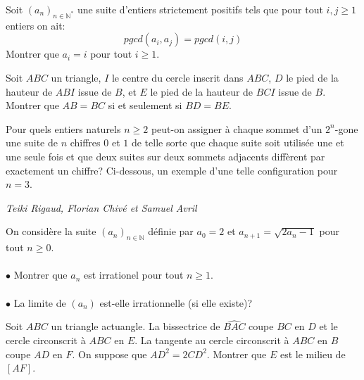 \begin{exo}{}
Soit $(a_n)_{n\in \mathbb{N}^*}$ une suite d'entiers strictement positifs tels que pour tout $i,j\ge 1$ entiers on ait:
$$pgcd(a_i,a_j)=pgcd(i,j)$$
Montrer que $a_i=i$ pour tout $i\ge 1$.
\end{exo}

\begin{exo}{}
Soit $ABC$ un triangle, $I$ le centre du cercle inscrit dans $ABC$, $D$ le pied de la hauteur de $ABI$ issue de $B$,
et $E$ le pied de la hauteur de $BCI$ issue de $B$.
Montrer que $AB = BC$ si et seulement si $BD = BE$.
\end{exo}

\begin{exo}{}
Pour quels entiers naturels $n\geq2$ peut-on assigner à chaque sommet d'un $2^n$-gone une suite de $n$ chiffres $0$ et $1$ de telle sorte que chaque suite soit utilisée une et une seule fois et que deux suites sur deux sommets adjacents diffèrent par exactement un chiffre? Ci-dessous, un exemple d'une telle configuration pour $n=3$.
\begin{center}
\end{center}

\medskip
\textit{Teiki Rigaud, Florian Chivé et Samuel Avril}
\end{exo}

\begin{exo}{}
On considère la suite $(a_n)_{n\in \mathbb{N}}$ définie par $a_0=2$ et $a_{n+1}=\sqrt{2a_n-1}$ pour tout $n\ge 0$.\\~~\\
$\bullet$ Montrer que $a_n$ est irrationel pour tout $n\ge 1$.\\~~\\
$\bullet$ La limite de $(a_n)$ est-elle irrationnelle (si elle existe)?
\end{exo}



\begin{exo}{}
Soit $ABC$ un triangle actuangle. La bissectrice de $\widehat{BAC}$ coupe $BC$ en $D$ et le cercle circonscrit à $ABC$ en $E$. La tangente au cercle circonscrit à $ABC$ en $B$ coupe $AD$ en $F$. On suppose que $AD^2=2CD^2$. Montrer que $E$ est le milieu de $[AF]$.
 \end{exo}
 
